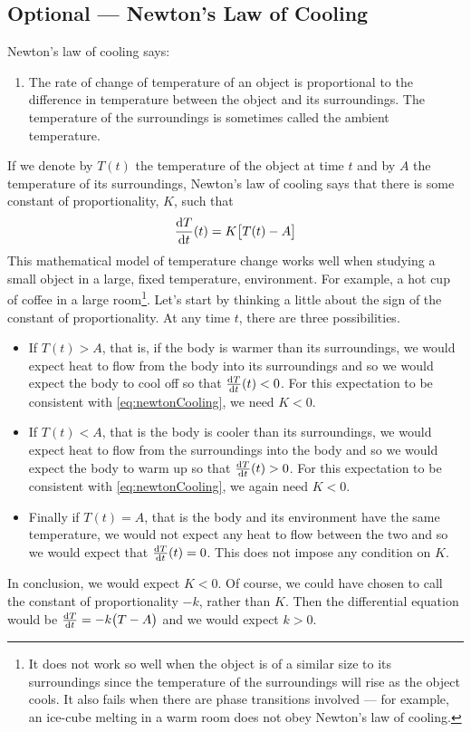 \subsection{Optional --- Newton's Law of Cooling}
Newton's law of cooling says:
\begin{enumerate}[]
\item The rate of change of temperature of an object is proportional to
the difference in temperature between the object and its surroundings.
The temperature of the surroundings is sometimes called the ambient
temperature.
\end{enumerate}
If we denote by $T(t)$ the temperature of the object at time $t$
and by $A$ the temperature of its surroundings, Newton's law of cooling
says that there is some constant of proportionality, $K$, such that
\begin{equation}\label{eq:newtonCooling}
\diff{T}{t}(t) = K\big[T(t)-A\big]
\end{equation}
This mathematical model of temperature change works well when
studying a small object in a large, fixed temperature, environment.
For example, a hot cup of coffee in a large room\footnote{It does not
work so well when the object is of a similar size to its surroundings
since the temperature of the surroundings will rise as the object cools.
It also fails when there are phase transitions involved --- for example,
an ice-cube melting in a warm room does not obey Newton's law of cooling.}.
Let's start by thinking a little about
the sign of the constant of proportionality. At any time $t$,
there are three possibilities.
\begin{itemize} \itemsep1pt \parskip0pt
  \item  If $T(t)>A$, that is, if the body is warmer than its surroundings,
         we would expect heat to flow from the body into its surroundings
         and so we would expect the body to cool off so that
         $\diff{T}{t}(t)<0$. For this
         expectation to be consistent with \eqref{eq:newtonCooling},
         we need $K<0$.
  \item  If $T(t)<A$, that is the body is cooler than its surroundings,
         we would expect heat to flow from the surroundings into the body
         and so we would expect the body to warm up so that
         $\diff{T}{t}(t)>0$. For this
         expectation to be consistent with \eqref{eq:newtonCooling},
         we again need $K<0$.
  \item  Finally if $T(t)=A$, that is the body and its environment have
         the same temperature, we would not expect any heat to flow between
         the two and so we would expect that $\diff{T}{t}(t)=0$. This
         does not impose any condition on $K$.
\end{itemize}
In conclusion, we would expect $K<0$. Of course, we could have chosen to
call the constant of proportionality $-k$, rather than $K$. Then the
differential equation would be  $\diff{T}{t} = -k\big(T-A\big)$
and we would expect $k>0$.

